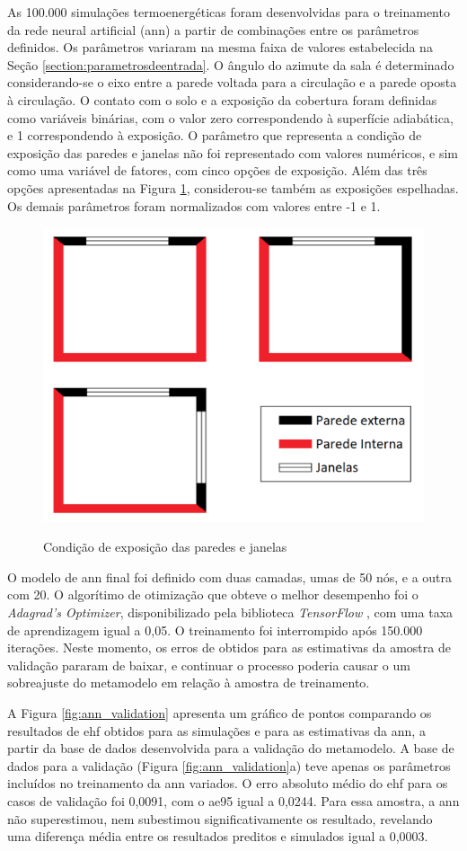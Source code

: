\documentclass[brazil,hardcopy,openany]{ufscthesis} %
\begin{document}
As 100.000 simulações termoenergéticas foram desenvolvidas para o treinamento da rede neural artificial (\acrshort{ann}) a partir de combinações entre os parâmetros definidos.
Os parâmetros variaram na mesma faixa de valores estabelecida na Seção \ref{section:parametrosdeentrada}. O ângulo do azimute da sala é determinado considerando-se o eixo entre a parede voltada para a circulação e a parede oposta à circulação.
O contato com o solo e a exposição da cobertura foram definidas como variáveis binárias, com o valor zero correspondendo à superfície adiabática, e 1 correspondendo à exposição.
O parâmetro que representa a condição de exposição das paredes e janelas não foi representado com valores numéricos, e sim como uma variável de fatores, com cinco opções de exposição. Além das três opções apresentadas na Figura \ref{fig:exp_sz}, considerou-se também as exposições espelhadas. 	
Os demais parâmetros foram normalizados com valores entre -1 e 1.

\begin{figure}[h]
	\centering
	\caption{Condição de exposição das paredes e janelas}
	\includegraphics[width=.5\linewidth]{img/wallexposition2.png}
	\label{fig:exp_sz}
\end{figure}

O modelo de \acrshort{ann} final foi definido com duas camadas, umas de 50 nós, e a outra com 20. 
O algorítimo de otimização que obteve o melhor desempenho foi o \textit{Adagrad's Optimizer}, disponibilizado pela biblioteca \textit{TensorFlow} \cite{tensorflow2015}, com uma taxa de aprendizagem igual a 0,05. O treinamento foi interrompido após 150.000 iterações. Neste momento, os erros de obtidos para as estimativas da amostra de validação pararam de baixar, e continuar o processo poderia causar o um sobreajuste do metamodelo em relação à amostra de treinamento.

A Figura \ref{fig:ann_validation} apresenta um gráfico de pontos comparando os resultados de \acrshort{ehf} obtidos para as simulações e para as estimativas da \acrshort{ann}, a partir da base de dados desenvolvida para a validação do metamodelo. A base de dados para a validação (Figura \ref{fig:ann_validation}a) teve apenas os parâmetros incluídos no treinamento da \acrshort{ann} variados. 
O erro absoluto médio do \acrshort{ehf} para os casos de validação foi 0,0091, com o \acrshort{ae95} igual a 0,0244.
Para essa amostra, a \acrshort{ann} não superestimou, nem subestimou significativamente os resultado, revelando uma diferença média entre os resultados preditos e simulados igual a 0,0003.
\end{document}
